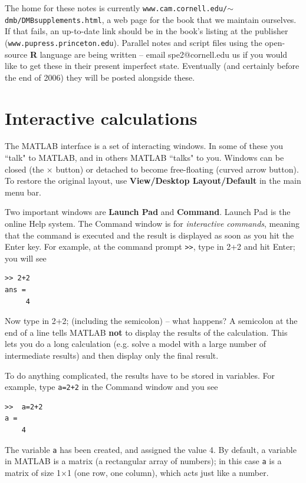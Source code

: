 \documentclass [11pt]{article}
\newcommand{\ttt}[1]{\texttt{#1}}
\numberwithin{exercise}{section}
\begin{document}
The home for these notes is currently \texttt{www.cam.cornell.edu/$\sim$dmb/DMBsupplements.html},
a web page for the book that we maintain ourselves. If that fails, an up-to-date link should 
be in the book's listing at the publisher (\texttt{www.pupress.princeton.edu}).   
Parallel notes and script files using the open-source \textbf{R} language are being written -- email 
spe2@cornell.edu us if you would like to get these in their present imperfect state. Eventually 
(and certainly before the end of 2006) they will be posted alongside these. 

\section{Interactive calculations}
\vspace{-0.15in} 
The MATLAB interface is a set of interacting windows. In some of these you 
``talk" to MATLAB, and in others MATLAB ``talks" to you. Windows can be closed 
(the \textbf{$\times $} button) or detached to become free-floating (curved 
arrow button). To restore the original layout, use \textbf{View/Desktop 
Layout/Default} in the main menu bar. 

Two important windows are \textbf{Launch Pad} and \textbf{Command}. 
Launch Pad is the online Help system. The Command window is for  
\textit{interactive commands}, meaning that the command is executed and 
the result is displayed as soon as you hit the Enter key. For example, at 
the command prompt \ttt{>>}, type in 2+2 and hit Enter; you will see 
\begin{verbatim}
>> 2+2
ans =
     4
\end{verbatim}
Now type in 2+2; (including the semicolon) -- what happens? A semicolon at 
the end of a line tells MATLAB \textbf{not} to display the results of the 
calculation. This lets you do a long calculation (e.g. solve a model with 
a large number of intermediate results) and then display only the final result. 

To do anything complicated, the results have to be stored 
in variables. For example, type \texttt{a=2+2} in the Command window and you 
see 
\begin{verbatim}
>>  a=2+2
a =
    4
\end{verbatim}
The variable \texttt{a} has been created, and assigned the value 4. By 
default, a variable in MATLAB is a matrix (a rectangular array of numbers); 
in this case \texttt{a} is a matrix of size 1$\times $1 (one row, one 
column), which acts just like a number. 
\end{document}

